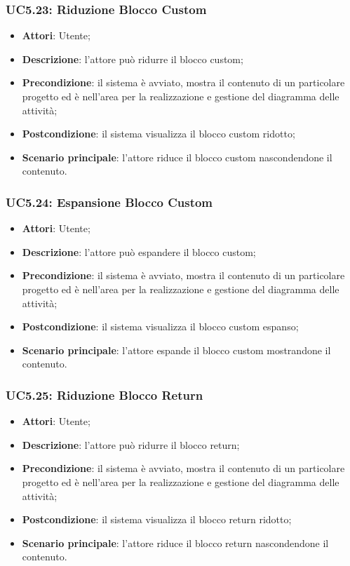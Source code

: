\subsubsection{UC5.23: Riduzione Blocco Custom}
\label{UC5.23}
\begin{itemize}
	\item \textbf{Attori}: Utente;
	\item \textbf{Descrizione}: l'attore può ridurre il blocco custom;
	\item \textbf{Precondizione}: il sistema è avviato, mostra il contenuto di un particolare progetto ed è nell'area per la realizzazione e gestione del diagramma delle attività;
	\item \textbf{Postcondizione}: il sistema visualizza il blocco custom ridotto;
	\item \textbf{Scenario principale}: l'attore riduce il blocco custom nascondendone il contenuto.
\end{itemize}

\subsubsection{UC5.24: Espansione Blocco Custom}
\label{UC5.24}
\begin{itemize}
	\item \textbf{Attori}: Utente;
	\item \textbf{Descrizione}: l'attore può espandere il blocco custom;
	\item \textbf{Precondizione}: il sistema è avviato, mostra il contenuto di un particolare progetto ed è nell'area per la realizzazione e gestione del diagramma delle attività;
	\item \textbf{Postcondizione}: il sistema visualizza il blocco custom espanso;
	\item \textbf{Scenario principale}: l'attore espande il blocco custom mostrandone il contenuto.
\end{itemize}

\subsubsection{UC5.25: Riduzione Blocco Return}
\label{UC5.25}
\begin{itemize}
	\item \textbf{Attori}: Utente;
	\item \textbf{Descrizione}: l'attore può ridurre il blocco return;
	\item \textbf{Precondizione}: il sistema è avviato, mostra il contenuto di un particolare progetto ed è nell'area per la realizzazione e gestione del diagramma delle attività;
	\item \textbf{Postcondizione}: il sistema visualizza il blocco return ridotto;
	\item \textbf{Scenario principale}: l'attore riduce il blocco return nascondendone il contenuto.
\end{itemize}

